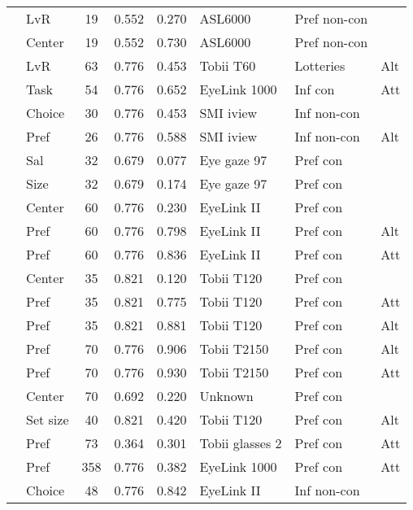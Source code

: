 \begin{longtable}{p{5cm}lccclll}
  \cite{kreplin2014a} & LvR & 19 & 0.552 & 0.270 & ASL6000 & Pref non-con &  \\ 
  \cite{kreplin2014a} & Center & 19 & 0.552 & 0.730 & ASL6000 & Pref non-con &  \\ 
  \cite{kwak2018} & LvR & 63 & 0.776 & 0.453 & Tobii T60 & Lotteries & Alt \\ 
  \cite{leboeuf2016} & Task & 54 & 0.776 & 0.652 & EyeLink 1000 & Inf con & Att \\ 
  \cite{lindner2014} & Choice & 30 & 0.776 & 0.453 & SMI iview & Inf non-con &  \\ 
  \cite{lindner2014} & Pref & 26 & 0.776 & 0.588 & SMI iview & Inf non-con & Alt \\ 
  \cite{lohse1997a} & Sal & 32 & 0.679 & 0.077 & Eye gaze 97 & Pref con &  \\ 
  \cite{lohse1997a} & Size & 32 & 0.679 & 0.174 & Eye gaze 97 & Pref con &  \\ 
  \cite{meissner2016a} & Center & 60 & 0.776 & 0.230 & EyeLink II & Pref con &  \\ 
  \cite{meissner2016a} & Pref & 60 & 0.776 & 0.798 & EyeLink II & Pref con & Alt \\ 
  \cite{meissner2016a} & Pref & 60 & 0.776 & 0.836 & EyeLink II & Pref con & Att \\ 
  \cite{meissner2016a} & Center & 35 & 0.821 & 0.120 & Tobii T120 & Pref con &  \\ 
  \cite{meissner2016a} & Pref & 35 & 0.821 & 0.775 & Tobii T120 & Pref con & Att \\ 
  \cite{meissner2016a} & Pref & 35 & 0.821 & 0.881 & Tobii T120 & Pref con & Alt \\ 
  \cite{meissner2016a} & Pref & 70 & 0.776 & 0.906 & Tobii T2150 & Pref con & Alt \\ 
  \cite{meissner2016a} & Pref & 70 & 0.776 & 0.930 & Tobii T2150 & Pref con & Att \\ 
  \cite{meissner2016a} & Center & 70 & 0.692 & 0.220 & Unknown & Pref con &  \\ 
  \cite{meissner2016b} & Set size & 40 & 0.821 & 0.420 & Tobii T120 & Pref con & Alt \\ 
  \cite{meyerding2018} & Pref & 73 & 0.364 & 0.301 & Tobii glasses 2 & Pref con & Att \\ 
  \cite{miller2015} & Pref & 358 & 0.776 & 0.382 & EyeLink 1000 & Pref con & Att \\ 
  \cite{mitsuda2014} & Choice & 48 & 0.776 & 0.842 & EyeLink II & Inf non-con &  \\ 

\end{longtable}
